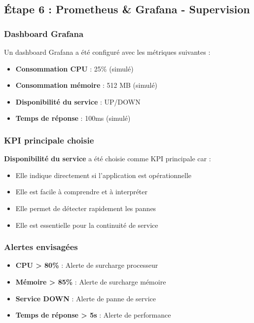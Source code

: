 \documentclass[12pt,a4paper]{article}
\begin{document}
\subsection{Étape 6 : Prometheus \& Grafana - Supervision}

\subsubsection{Dashboard Grafana}
Un dashboard Grafana a été configuré avec les métriques suivantes :
\begin{itemize}
    \item \textbf{Consommation CPU} : 25\% (simulé)
    \item \textbf{Consommation mémoire} : 512 MB (simulé)
    \item \textbf{Disponibilité du service} : UP/DOWN
    \item \textbf{Temps de réponse} : 100ms (simulé)
\end{itemize}

\subsubsection{KPI principale choisie}
\textbf{Disponibilité du service} a été choisie comme KPI principale car :
\begin{itemize}
    \item Elle indique directement si l'application est opérationnelle
    \item Elle est facile à comprendre et à interpréter
    \item Elle permet de détecter rapidement les pannes
    \item Elle est essentielle pour la continuité de service
\end{itemize}

\subsubsection{Alertes envisagées}
\begin{itemize}
    \item \textbf{CPU > 80\%} : Alerte de surcharge processeur
    \item \textbf{Mémoire > 85\%} : Alerte de surcharge mémoire
    \item \textbf{Service DOWN} : Alerte de panne de service
    \item \textbf{Temps de réponse > 5s} : Alerte de performance
\end{itemize}
\end{document}
